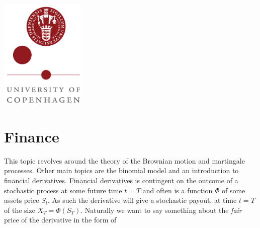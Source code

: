 \documentclass[
]{article}
\begin{document}
{\begin{titlepage}




\includegraphics[height=200px, keepaspectratio]{logo_ku.png}\\[4cm] %
 

\vfill %
\end{titlepage}
\setcounter{tocdepth}{4}
\tableofcontents
}
\thispagestyle{empty}
\newpage
\setcounter{page}{1}
\pagestyle{fancy}
\hypertarget{finance}{%
\section{Finance}\label{finance}}

This topic revolves around the theory of the Brownian motion and
martingale processes. Other main topics are the binomial model and an
introduction to financial derivatives. Financial derivatives is
contingent on the outcome of a stochastic process at some future time
\(t=T\) and often is a function \(\Phi\) of some assets price \(S_t\).
As such the derivative will give a stochastic payout, at time \(t=T\) of
the size \(X_T=\Phi(S_T)\). Naturally we want to say something about the
\emph{fair} price of the derivative in the form of
\end{document}
